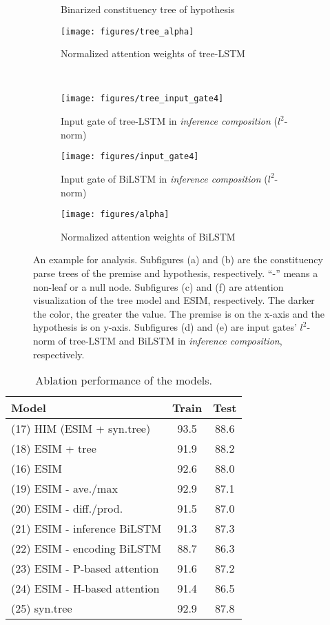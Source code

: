 \documentclass[11pt,a4paper]{article}
\begin{document}
\begin{figure*}[!ht]
\begin{subfigure}[b]{0.58\textwidth}
\begin{tikzpicture}
        \end{tikzpicture}
		\caption{Binarized constituency tree of hypothesis}
		\label{fig:tree_hypothesis}
		\texttt{[image: figures/tree\_alpha]}
		\caption{Normalized attention weights of tree-LSTM}
		\label{fig:tree_alpha}	
	\end{subfigure}
	~ \begin{subfigure}[b]{0.40\textwidth}
		\texttt{[image: figures/tree\_input\_gate4]}
		\caption{Input gate of tree-LSTM in \textit{inference composition} ($l^2$-norm)}
		\label{fig:tree_input_gate4}
		\texttt{[image: figures/input\_gate4]}
		\caption{Input gate of BiLSTM in \textit{inference composition} ($l^2$-norm)}
		\label{fig:input_gate4}
        \center
		\texttt{[image: figures/alpha]}
		\caption{Normalized attention weights of BiLSTM}
		\label{fig:alpha}		
	\end{subfigure}
	\caption{An example for analysis. Subfigures (a) and (b) are the constituency parse trees of the premise and hypothesis, respectively. ``-'' means a non-leaf or a null node. Subfigures (c) and (f) are attention visualization of the tree model and ESIM, respectively. The darker the color, the greater the value. The premise is on the x-axis and the hypothesis is on y-axis. Subfigures (d) and (e) are input gates' $l^2$-norm of tree-LSTM and BiLSTM in \textit{inference composition}, respectively. }
	\label{fig:visualization}
\end{figure*}

\begin{table}[h]
	\renewcommand{\arraystretch}{0.9}
    \setlength{\tabcolsep}{0.3em}
	\centering
	\begin{tabular}{lcc}
		\toprule
		Model      &  Train  &  Test  \\
		\midrule
		(17) HIM (ESIM + syn.tree) & 93.5 & 88.6 \\
		(18) ESIM + tree & 91.9 & 88.2 \\
		(16) ESIM  & 92.6 & 88.0 \\
		(19) ESIM - ave./max & 92.9 & 87.1\\
		(20) ESIM - diff./prod. & 91.5 & 87.0\\
        (21) ESIM - inference BiLSTM & 91.3 & 87.3\\
        (22) ESIM - encoding BiLSTM & 88.7 & 86.3\\
        (23) ESIM - P-based attention & 91.6 & 87.2\\
        (24) ESIM - H-based attention & 91.4 & 86.5\\
        (25) syn.tree   & 92.9 & 87.8\\
		\bottomrule
	\end{tabular}
    \caption{Ablation performance of the models. } 	
	\label{tab:ablation}
\end{table}
\end{document}
